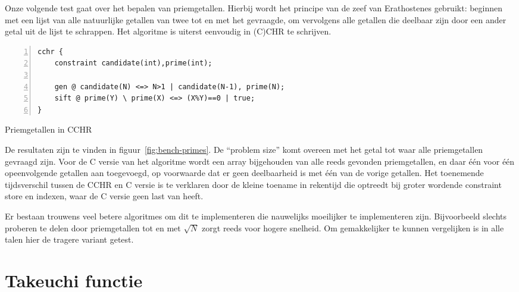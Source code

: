 Onze volgende test gaat over het bepalen van priemgetallen. Hierbij wordt het principe van de zeef van Erathostenes gebruikt: beginnen met een lijst van alle natuurlijke getallen van twee tot en met het gevraagde, om vervolgens alle getallen die deelbaar zijn door een ander getal uit de lijst te schrappen. Het algoritme is uiterst eenvoudig in (C)CHR te schrijven.
\begin{exCode}
\begin{Verbatim}[frame=single,numbers=left]
cchr {
    constraint candidate(int),prime(int);

    gen @ candidate(N) <=> N>1 | candidate(N-1), prime(N);
    sift @ prime(Y) \ prime(X) <=> (X%Y)==0 | true;
}
\end{Verbatim}
\caption{\label{code:primes} Priemgetallen in CCHR}
\end{exCode}
De resultaten zijn te vinden in figuur~\ref{fig:bench-primes}. De ``problem size'' komt overeen met het getal tot waar alle priemgetallen gevraagd zijn. Voor de C versie van het algoritme wordt een array bijgehouden van alle reeds gevonden priemgetallen, en daar \'e\'en voor \'e\'en opeenvolgende getallen aan toegevoegd, op voorwaarde dat er geen deelbaarheid is met \'e\'en van de vorige getallen. Het toenemende tijdsverschil tussen de CCHR en C versie is te verklaren door de kleine toename in rekentijd die optreedt bij groter wordende constraint store en indexen, waar de C versie geen last van heeft.

Er bestaan trouwens veel betere algoritmes om dit te implementeren die nauwelijks moeilijker te implementeren zijn. Bijvoorbeeld slechts proberen te delen door priemgetallen tot en met $\sqrt{N}$ zorgt reeds voor hogere snelheid. Om gemakkelijker te kunnen vergelijken is in alle talen hier de tragere variant getest.

\section{Takeuchi functie} \label{sec:bench-tak}

